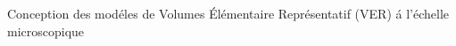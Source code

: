 \documentclass[final]{beamer}
\begin{document}
\begin{frame}
\begin{center}
\begin{minipage}{\textwidth}
\begin{exampleblock}{\rule[-0.6ex]{0pt}{50pt}\centering\LARGE Conception des mod\'eles de Volumes \'El\'ementaire Repr\'esentatif (VER) \'a l'\'echelle microscopique}
\begin{columns}
\begin{column}{0.2\textwidth}
\begin{center}
\begin{figure}[!h]
\end{figure}
     \end{center}
\end{column}
\end{columns}
\end{exampleblock}
\end{minipage}
\end{center}


\end{frame}
\end{document}
